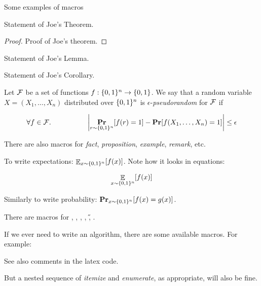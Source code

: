 \documentclass[11pt]{article}
\begin{document}

Some examples of macros

\begin{theorem} Statement of Joe's Theorem.
\end{theorem}


\begin{proof}
Proof of Joe's theorem.
\end{proof}


\begin{lemma} Statement of Joe's Lemma.
\end{lemma}

\begin{corollary} Statement of Joe's Corollary.
\end{corollary}

\begin{definition} [Pseudorandomness]
Let $\cal F$ be a set of functions $f: \{0,1\}^n \to \{0,1\}$. We say that
a random variable $X= (X_1,\ldots,X_n)$ distributed over $\{0,1\}^n$
is $\epsilon$-{\em pseudorandom} for $\cal F$ if 

\begin{equation} 
\forall f \in \mbox{$\mathcal{F}$}. \hspace{50pt}  \left| \mathop{\bf {Pr}}_{r\sim \{0,1\}^n} [f(r)=1] - \mathop{\bf {Pr}} [ f(X_1,\ldots,X_n) = 1] \right| \leq \epsilon
\end{equation}
\end{definition}

There are also macros for {\em fact}, {\em proposition}, {\em example}, {\em remark}, etc.

To write expectations: $\mathop\mathbb{E}_{x \sim \{0,1\}^n} [ f(x)]$. Note how it looks in equations:

\begin{equation}
\mathop\mathbb{E}_{x \sim \{0,1\}^n} [ f(x)]
\end{equation}

Similarly to write probability: $\mathop{\bf {Pr}}_{x\sim \{0,1\}^n} [ f(x) = g(x) ]$.

There are macros for \N, \Z, \R, \B, \H, \F.

If we ever need to write an algorithm, there are some available macros. For example:

\noindent{}


\bigskip

See also comments in the latex code.

But a nested sequence of {\em itemize} and {\em enumerate}, as appropriate, will also be fine.
\end{document}
